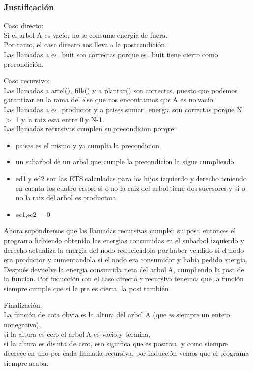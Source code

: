 \documentclass[10pt]{article}
\begin{document}
\subsubsection{Justificación}
\begin{description}
\item{Caso directo:} \\
Si el arbol A es vacío, no se consume energia de fuera. \\
Por tanto, el caso directo nos lleva a la postcondición. \\
Las llamadas a es\_buit son correctas porque es\_buit tiene cierto como precondición.
\item{Caso recursivo:} \\
Las llamadas a arrel(), fills() y a plantar() son correctas, puesto que podemos garantizar en la rama del else
que nos encontramos que A es no vacío. \\
Las llamadas a es\_productor y a paises.sumar\_energia son correctas porque N $>$ 1 y la raiz esta entre 0 y N-1. \\
Las llamadas recursivas cumplen su precondicion porque:
\begin{itemize}
\item paises es el mismo y ya cumplia la precondicion
\item un subarbol de un arbol que cumple la precondicion la sigue cumpliendo
\item ed1 y ed2 son las ETS calculadas para los hijos izquierdo y derecho teniendo en cuenta los cuatro casos: si o no la raiz del arbol tiene dos sucesores y si o no la raiz del arbol es productora
\item ec1,ec2 = 0
\end{itemize}
Ahora supondremos que las llamadas recursivas cumplen su post, entonces el programa habiendo obtenido las energias consumidas en el subarbol izquierdo y derecho actualiza la energia del nodo reduciendola por haber vendido si el nodo era productor y aumentandola si el nodo era consumidor y habia pedido energia. Después devuelve la energia consumida neta del arbol A, cumpliendo la post de la función.
Por inducción con el caso directo y recursivo tenemos que la función siempre cumple que si la pre es cierta, la post también.
\item{Finalización:} \\
La función de cota obvia es la altura del arbol A (que es siempre un entero nonegativo), \\
si la altura es cero el arbol A es vacio y termina,\\
si la altura es disinta de cero, eso significa que es positiva, y como siempre decrece en uno por cada llamada recursiva, por inducción vemos que el programa siempre acaba.
 
\end{description}
\end{document}
